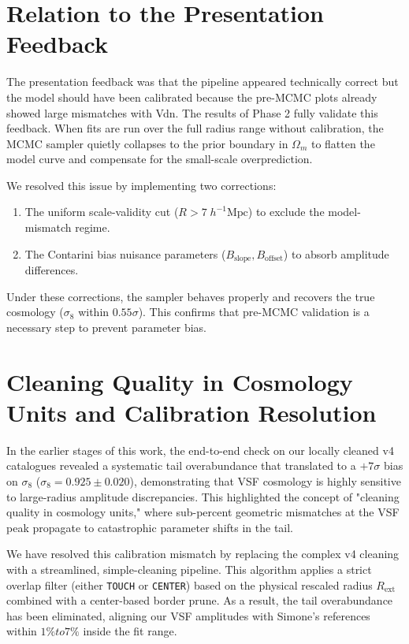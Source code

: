 \documentclass[12pt]{report}
\begin{document}
\section{Relation to the Presentation Feedback}

The presentation feedback was that the pipeline appeared technically correct but the model should have been calibrated because the pre-MCMC plots already showed large mismatches with Vdn. The results of Phase 2 fully validate this feedback. When fits are run over the full radius range without calibration, the MCMC sampler quietly collapses to the prior boundary in $\Omega_m$ to flatten the model curve and compensate for the small-scale overprediction.

We resolved this issue by implementing two corrections:
\begin{enumerate}
    \item The uniform scale-validity cut ($R > 7\;h^{-1}\mathrm{Mpc}$) to exclude the model-mismatch regime.
    \item The Contarini bias nuisance parameters ($B_{\mathrm{slope}}, B_{\mathrm{offset}}$) to absorb amplitude differences.
\end{enumerate}
Under these corrections, the sampler behaves properly and recovers the true cosmology ($\sigma_8$ within $0.55\sigma$). This confirms that pre-MCMC validation is a necessary step to prevent parameter bias.

\section{Cleaning Quality in Cosmology Units and Calibration Resolution}

In the earlier stages of this work, the end-to-end check on our locally cleaned v4 catalogues revealed a systematic tail overabundance that translated to a $+7\sigma$ bias on $\sigma_8$ ($\sigma_8 = 0.925 \pm 0.020$), demonstrating that VSF cosmology is highly sensitive to large-radius amplitude discrepancies. This highlighted the concept of "cleaning quality in cosmology units," where sub-percent geometric mismatches at the VSF peak propagate to catastrophic parameter shifts in the tail.

We have resolved this calibration mismatch by replacing the complex v4 cleaning with a streamlined, simple-cleaning pipeline. This algorithm applies a strict overlap filter (either \texttt{TOUCH} or \texttt{CENTER}) based on the physical rescaled radius $R_{\mathrm{ext}}$ combined with a center-based border prune. As a result, the tail overabundance has been eliminated, aligning our VSF amplitudes with Simone's references within $1\% to 7\%$ inside the fit range.
\end{document}
